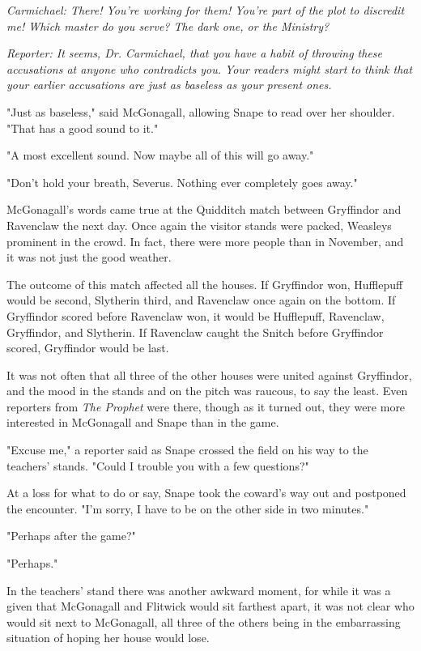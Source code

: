 \emph{Carmichael: There! You're working for them! You're part of the plot to discredit me! Which master do you serve? The dark one, or the Ministry?}

\emph{Reporter: It seems, Dr. Carmichael, that you have a habit of throwing these accusations at anyone who contradicts you. Your readers might start to think that your earlier accusations are just as baseless as your present ones.}

"Just as baseless," said McGonagall, allowing Snape to read over her shoulder. "That has a good sound to it."

"A most excellent sound. Now maybe all of this will go away."

"Don't hold your breath, Severus. Nothing ever completely goes away."

McGonagall's words came true at the Quidditch match between Gryffindor and Ravenclaw the next day. Once again the visitor stands were packed, Weasleys prominent in the crowd. In fact, there were more people than in November, and it was not just the good weather.

The outcome of this match affected all the houses. If Gryffindor won, Hufflepuff would be second, Slytherin third, and Ravenclaw once again on the bottom. If Gryffindor scored before Ravenclaw won, it would be Hufflepuff, Ravenclaw, Gryffindor, and Slytherin. If Ravenclaw caught the Snitch before Gryffindor scored, Gryffindor would be last.

It was not often that all three of the other houses were united against Gryffindor, and the mood in the stands and on the pitch was raucous, to say the least. Even reporters from \emph{The Prophet} were there, though as it turned out, they were more interested in McGonagall and Snape than in the game.

"Excuse me," a reporter said as Snape crossed the field on his way to the teachers' stands. "Could I trouble you with a few questions?"

At a loss for what to do or say, Snape took the coward's way out and postponed the encounter. "I'm sorry, I have to be on the other side in two minutes."

"Perhaps after the game?"

"Perhaps."

In the teachers' stand there was another awkward moment, for while it was a given that McGonagall and Flitwick would sit farthest apart, it was not clear who would sit next to McGonagall, all three of the others being in the embarrassing situation of hoping her house would lose.

